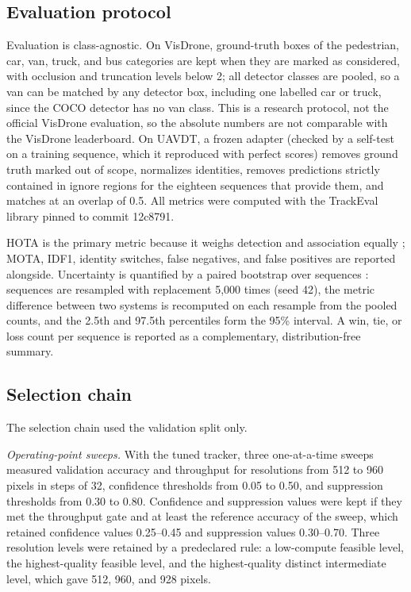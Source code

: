 

\subsection{Evaluation protocol}
Evaluation is class-agnostic. On VisDrone, ground-truth boxes of the pedestrian, car, van, truck, and bus categories are kept when they are marked as considered, with occlusion and truncation levels below 2; all detector classes are pooled, so a van can be matched by any detector box, including one labelled car or truck, since the COCO detector has no van class. This is a research protocol, not the official VisDrone evaluation, so the absolute numbers are not comparable with the VisDrone leaderboard. On UAVDT, a frozen adapter (checked by a self-test on a training sequence, which it reproduced with perfect scores) removes ground truth marked out of scope, normalizes identities, removes predictions strictly contained in ignore regions for the eighteen sequences that provide them, and matches at an overlap of 0.5. All metrics were computed with the TrackEval library pinned to commit 12c8791.

HOTA is the primary metric because it weighs detection and association equally \cite{luiten2021hota}; MOTA, IDF1, identity switches, false negatives, and false positives are reported alongside. Uncertainty is quantified by a paired bootstrap over sequences \cite{efron1993bootstrap}: sequences are resampled with replacement 5,000 times (seed 42), the metric difference between two systems is recomputed on each resample from the pooled counts, and the 2.5th and 97.5th percentiles form the 95\% interval. A win, tie, or loss count per sequence is reported as a complementary, distribution-free summary.

\subsection{Selection chain}
The selection chain used the validation split only.

\emph{Operating-point sweeps.} With the tuned tracker, three one-at-a-time sweeps measured validation accuracy and throughput for resolutions from 512 to 960 pixels in steps of 32, confidence thresholds from 0.05 to 0.50, and suppression thresholds from 0.30 to 0.80. Confidence and suppression values were kept if they met the throughput gate and at least the reference accuracy of the sweep, which retained confidence values 0.25--0.45 and suppression values 0.30--0.70. Three resolution levels were retained by a predeclared rule: a low-compute feasible level, the highest-quality feasible level, and the highest-quality distinct intermediate level, which gave 512, 960, and 928 pixels.

